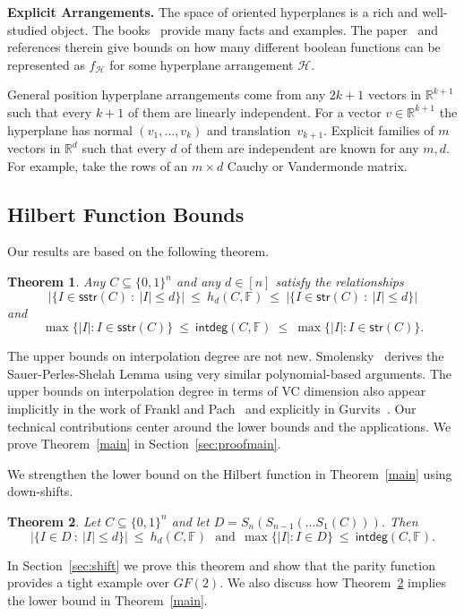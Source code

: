 \documentclass[11pt]{article}
\newtheorem{theorem}{Theorem}[section]
\theoremstyle{definition}
\newcommand{\1}{\mathbf{1}}
\newcommand{\R}{{\mathbb R}}
\newcommand{\F}{{\mathbb F}}
\renewcommand{\leq}{\leqslant}
\newcommand{\sstr}{\mathsf{sstr}}
\newcommand{\str}{\mathsf{str}}
\renewcommand{\int}{\mathsf{intdeg}}
\begin{document}
\noindent 
{\bf Explicit Arrangements.} 
The space of oriented hyperplanes is a rich and well-studied object.  The books~\cite{matousek, stanley} provide many facts and examples.  The paper~\cite{alon-geom} and references therein give bounds on how many different boolean functions can be represented as $f_\mathcal{H}$ for some hyperplane arrangement $\mathcal{H}$.

General position hyperplane arrangements come from any $2k+1$ vectors in $\R^{k+1}$ such that every $k+1$ of them are linearly independent.   For a vector $v \in \R^{k+1}$ the hyperplane has normal $(v_1,\ldots,v_k)$ and translation~$v_{k+1}$. 
Explicit families of $m$ vectors in $\R^{d}$ such that every $d$ of them are independent are known for any $m,d$. For example, take the rows of an $m\times d$ Cauchy or Vandermonde matrix. 

\subsection{Hilbert Function Bounds}
Our results are based on the following theorem.   
\begin{theorem}\label{rank}\label{main} Any $C \subseteq \{0,1\}^n$ and any $d \in [n]$ satisfy the  relationships 
\[ |\{ I \in \sstr(C)  \  :  \ |I| \leq d\}| \ \leq\  h_d(C,\F)\  \leq \ |\{ I \in \str(C)  \  :  \ |I| \leq d\}| \] and  
\[ \max\{|I|  :  I\in \sstr(C)\} \ \leq\ \int(C,\F)\ \leq \ \max\{|I|  :  I\in \str(C)\}.\] 
\end{theorem}
\noindent 
The upper bounds on interpolation degree are not new. Smolensky~\cite{smolensky-vc} derives the Sauer-Perles-Shelah Lemma using very similar polynomial-based arguments.   The upper bounds on interpolation degree in terms of VC dimension also appear implicitly in the work of Frankl and Pach~\cite{babai-frankl} and explicitly in Gurvits~\cite{gurvits}.    Our technical contributions center around the lower bounds and the applications.  We prove Theorem~\ref{main} in Section~\ref{sec:proofmain}.  

We strengthen the lower bound on the Hilbert function in Theorem~\ref{main} using down-shifts. 
\begin{theorem}\label{thm:shifthilbert}
Let $C\subseteq\{0,1\}^n$ and let $D=S_{n}(S_{n-1}(\ldots S_{1}(C)))$.
Then
\[ |\{ I \in D  \  :  \ |I| \leq d\}| \ \leq\  h_d(C,\F) \ \ \ \mathrm{and} \ \  \max\{|I|  :  I\in D\} \ \leq\ \int(C,\F).\]
\end{theorem}
\noindent
 In Section~\ref{sec:shift} we prove this theorem and show that the parity function provides a tight example over $GF(2)$.  We also discuss how Theorem~\ref{thm:shifthilbert} implies the lower bound in Theorem~\ref{main}.
\end{document}

